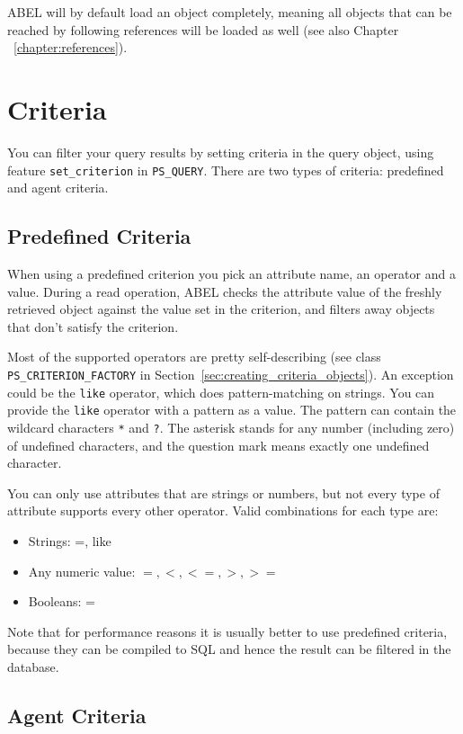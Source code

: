 \documentclass[a4paper,12pt]{report}
\begin{document}
ABEL will by default load an object completely, meaning all objects that can be reached by following references will be loaded as well (see also Chapter ~\ref{chapter:references}).

\section{Criteria}

You can filter your query results by setting criteria in the query object, using feature \lstinline{set_criterion} in \lstinline{PS_QUERY}.
There are two types of criteria: predefined and agent criteria.

\subsection{Predefined Criteria}
When using a predefined criterion you pick an attribute name, an operator and a value. 
During a read operation, ABEL checks the attribute value of the freshly retrieved object against the value set in the criterion, and filters away objects that don't satisfy the criterion.

Most of the supported operators are pretty self-describing (see class \lstinline{PS_CRITERION_FACTORY} in Section~\ref{sec:creating_criteria_objects}).
An exception could be the \lstinline!like! operator, which does pattern-matching on strings.
You can provide the \lstinline!like! operator with a pattern as a value. The pattern can contain the wildcard characters \lstinline!*! and \lstinline!?!.
The asterisk stands for any number (including zero) of undefined characters, and the question mark means exactly one undefined character.

You can only use attributes that are strings or numbers, but not every type of attribute supports every other operator. Valid combinations for each type are:

 \begin{itemize}
  \item Strings: =, like
  \item Any numeric value: $=, <, <=, >, >=$
  \item Booleans: =
 \end{itemize}

Note that for performance reasons it is usually better to use predefined criteria, because they can be compiled to SQL and hence the result can be filtered in the database.

\subsection{Agent Criteria}
\end{document}
